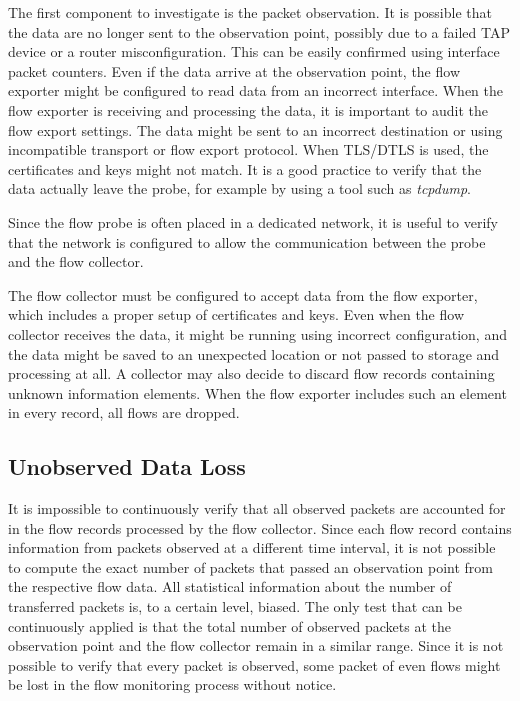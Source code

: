 The first component to investigate is the packet observation. It is possible that the data are no longer sent to the observation point, possibly due to a failed TAP device or a router misconfiguration. This can be easily confirmed using interface packet counters. Even if the data arrive at the observation point, the flow exporter might be configured to read data from an incorrect interface. When the flow exporter is receiving and processing the data, it is important to audit the flow export settings. The data might be sent to an incorrect destination or using incompatible transport or flow export protocol. When TLS/DTLS is used, the certificates and keys might not match. It is a good practice to verify that the data actually leave the probe, for example by using a tool such as \emph{tcpdump}.

Since the flow probe is often placed in a dedicated network, it is useful to verify that the network is configured to allow the communication between the probe and the flow collector.

The flow collector must be configured to accept data from the flow exporter, which includes a proper setup of certificates and keys. Even when the flow collector receives the data, it might be running using incorrect configuration, and the data might be saved to an unexpected location or not passed to storage and processing at all. A collector may also decide to discard flow records containing unknown information elements. When the flow exporter includes such an element in every record, all flows are dropped. 

\subsection{Unobserved Data Loss}

It is impossible to continuously verify that all observed packets are accounted for in the flow records processed by the flow collector. Since each flow record contains information from packets observed at a different time interval, it is not possible to compute the exact number of packets that passed an observation point from the respective flow data. All statistical information about the number of transferred packets is, to a certain level, biased. The only test that can be continuously applied is that the total number of observed packets at the observation point and the flow collector remain in a similar range. Since it is not possible to verify that every packet is observed, some packet of even flows might be lost in the flow monitoring process without notice.

